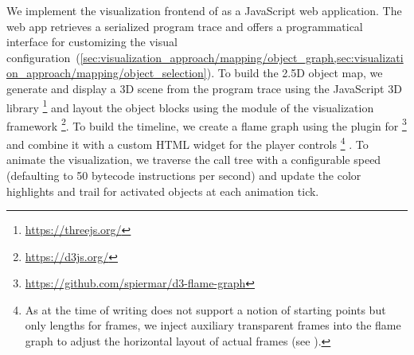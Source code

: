 We implement the visualization frontend of \tfd{} as a JavaScript web application.
The web app retrieves a serialized program trace and offers a programmatical interface for customizing the visual configuration~(\cref{sec:visualization_approach/mapping/object_graph,sec:visualization_approach/mapping/object_selection}).
To build the 2.5D object map, we generate and display a 3D scene from the program trace using the JavaScript 3D library \footnote{\url{https://threejs.org/}} and layout the object blocks using the  module of the visualization framework \footnote{\url{https://d3js.org/}}.
To build the timeline, we create a flame graph using the  plugin for \footnote{\url{https://github.com/spiermar/d3-flame-graph}} and combine it with a custom HTML widget for the player controls%
\footnote{As  at the time of writing does not support a notion of starting points but only lengths for frames, we inject auxiliary transparent frames into the flame graph to adjust the horizontal layout of actual frames (see ).}%
.
To animate the visualization, we traverse the call tree with a configurable speed (defaulting to 50 bytecode instructions per second) and update the color highlights and trail for activated objects at each animation tick.

